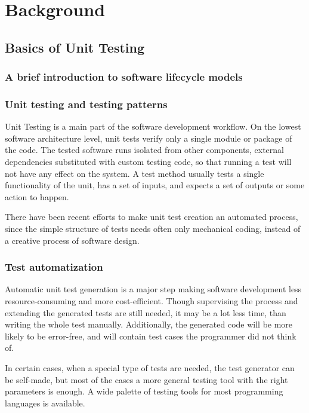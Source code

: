 \chapter{Background}
\section{Basics of Unit Testing}
\subsection{A brief introduction to software lifecycle models}
\subsection{Unit testing and testing patterns}
Unit Testing is a main part of the software development workflow. On the lowest software architecture level, unit tests verify only a single module or package of the code. The tested software runs isolated from other components, external dependencies substituted with custom testing code, so that running a test will not have any effect on the system. A test method usually tests a single functionality of the unit, has a set of inputs, and expects a set of outputs or some action to happen.

There have been recent efforts to make unit test creation an automated process, since the simple structure of tests needs often only mechanical coding, instead of a creative process of software design. 
\subsection{Test automatization}
Automatic unit test generation is a major step making software development less resource-consuming and more cost-efficient. Though supervising the process and extending the generated tests are still needed, it may be a lot less time, than writing the whole test manually. Additionally, the generated code will be more likely to be error-free, and will contain test cases the programmer did not think of.

In certain cases, when a special type of tests are needed, the test generator can be self-made, but most of the cases a more general testing tool with the right parameters is enough. A wide palette of testing tools for most programming languages is available. 

